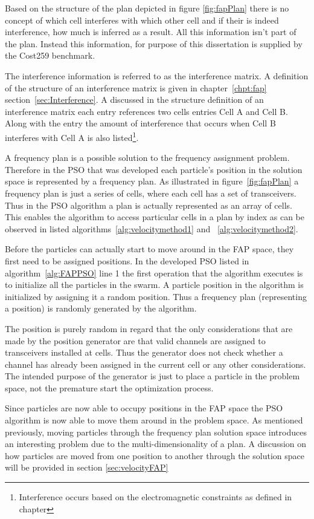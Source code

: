 Based on the structure of the plan depicted in figure \ref{fig:fapPlan} there is no concept of which cell interferes with which other cell and if their is indeed interference, how much is inferred as a result. All this information isn't part of the plan. Instead this information, for purpose of this dissertation is supplied by the Cost259 benchmark. 

The interference information is referred to as the interference matrix. A definition of the structure of an interference matrix is given in chapter~\ref{chpt:fap} section~\ref{sec:Interference}. A discussed in the structure definition of an interference matrix each entry references two cells entries Cell A and Cell B. Along with the entry the amount of interference that occurs when Cell B interferes with Cell A is also listed\footnote{Interference occurs based on the electromagnetic constraints as defined in chapter}.

A frequency plan is a possible solution to the frequency assignment problem. Therefore in the PSO that was developed each particle's position in the solution space is represented by a frequency plan. As illustrated in figure~\ref{fig:fapPlan} a frequency plan is just a series of cells, where each cell has a set of transceivers. Thus in the PSO algorithm a plan is actually represented as an array of cells. This enables the algorithm to access particular cells in a plan by index as can be observed in listed algorithms~\ref{alg:velocitymethod1} and ~\ref{alg:velocitymethod2}. 

Before the particles can actually start to move around in the FAP space, they first need to be assigned positions. In the developed PSO listed in algorithm~\ref{alg:FAPPSO} line 1 the first operation that the algorithm executes is to initialize all the particles in the swarm. A particle position in the algorithm is initialized by assigning it a random position. Thus a frequency plan (representing a position) is randomly generated by the algorithm.

The position is purely random in regard that the only considerations that are made by the position generator are that valid channels are assigned to transceivers installed at cells. Thus the generator does not check whether a channel has already been assigned in the current cell or any other considerations. The intended purpose of the generator is just to place a particle in the problem space, not the premature start the optimization process.

Since particles are now able to occupy positions in the FAP space the PSO algorithm is now able to move them around in the problem space. As mentioned previously, moving particles through the frequency plan solution space introduces an interesting problem due to the multi-dimensionality of a plan. A discussion on how particles are moved from one position to another through the solution space will be provided in section \ref{sec:velocityFAP}

